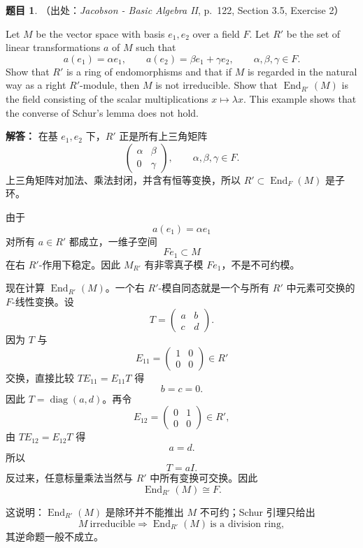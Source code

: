 \documentclass[a4paper]{ctexart}
\theoremstyle{definition}
\newtheorem{example}{题目}[section]
\theoremstyle{analysis}
\theoremstyle{plain}
\begin{document}
\begin{example}
（出处：\textit{Jacobson - Basic Algebra II}, p.~122, Section 3.5, Exercise 2）

Let \(M\) be the vector space with basis \(e_1,e_2\) over a field \(F\). Let \(R'\) be
the set of linear transformations \(a\) of \(M\) such that
\[
  a(e_1)=\alpha e_1,\qquad
  a(e_2)=\beta e_1+\gamma e_2,
  \qquad \alpha,\beta,\gamma\in F.
\]
Show that \(R'\) is a ring of endomorphisms and that if \(M\) is regarded in the
natural way as a right \(R'\)-module, then \(M\) is not irreducible. Show that
\(\operatorname{End}_{R'}(M)\) is the field consisting of the scalar
multiplications \(x\mapsto \lambda x\). This example shows that the converse of
Schur's lemma does not hold.

\textbf{解答：}
在基 \(e_1,e_2\) 下，\(R'\) 正是所有上三角矩阵
\[
  \begin{pmatrix}
    \alpha & \beta\\
    0 & \gamma
  \end{pmatrix},
  \qquad \alpha,\beta,\gamma\in F.
\]
上三角矩阵对加法、乘法封闭，并含有恒等变换，所以 \(R'\subset \operatorname{End}_F(M)\) 是子环。

由于
\[
  a(e_1)=\alpha e_1
\]
对所有 \(a\in R'\) 都成立，一维子空间
\[
  Fe_1\subset M
\]
在右 \(R'\)-作用下稳定。因此 \(M_{R'}\) 有非零真子模 \(Fe_1\)，不是不可约模。

现在计算 \(\operatorname{End}_{R'}(M)\)。一个右 \(R'\)-模自同态就是一个与所有 \(R'\) 中元素可交换的
\(F\)-线性变换。设
\[
  T=
  \begin{pmatrix}
    a & b\\
    c & d
  \end{pmatrix}.
\]
因为 \(T\) 与
\[
  E_{11}=
  \begin{pmatrix}
    1&0\\
    0&0
  \end{pmatrix}
  \in R'
\]
交换，直接比较 \(TE_{11}=E_{11}T\) 得
\[
  b=c=0.
\]
因此 \(T=\operatorname{diag}(a,d)\)。再令
\[
  E_{12}=
  \begin{pmatrix}
    0&1\\
    0&0
  \end{pmatrix}
  \in R',
\]
由 \(TE_{12}=E_{12}T\) 得
\[
  a=d.
\]
所以
\[
  T=aI.
\]
反过来，任意标量乘法当然与 \(R'\) 中所有变换可交换。因此
\[
  \operatorname{End}_{R'}(M)\cong F.
\]

这说明：\(\operatorname{End}_{R'}(M)\) 是除环并不能推出 \(M\) 不可约；Schur 引理只给出
\[
  M\ \text{irreducible}
  \Longrightarrow
  \operatorname{End}_{R'}(M)\ \text{is a division ring},
\]
其逆命题一般不成立。
\end{example}
\end{document}
